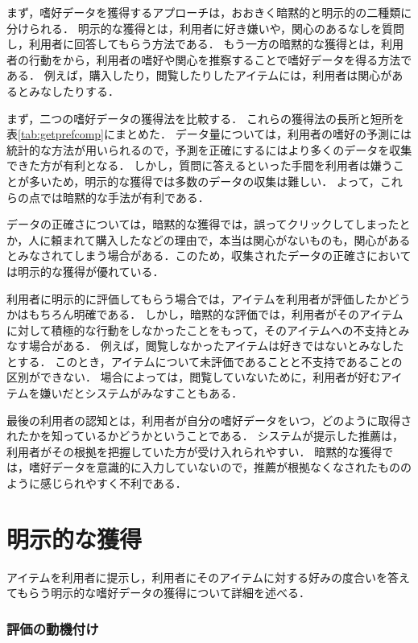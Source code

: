 まず，嗜好データを獲得するアプローチは，おおきく暗黙的と明示的の二種類に分けられる．
明示的な獲得とは，利用者に好き嫌いや，関心のあるなしを質問し，利用者に回答してもらう方法である．
もう一方の暗黙的な獲得とは，利用者の行動をから，利用者の嗜好や関心を推察することで嗜好データを得る方法である．
例えば，購入したり，閲覧したりしたアイテムには，利用者は関心があるとみなしたりする．

まず，二つの嗜好データの獲得法を比較する．
これらの獲得法の長所と短所を表\ref{tab:getprefcomp}にまとめた．
データ量については，利用者の嗜好の予測には統計的な方法が用いられるので，予測を正確にするにはより多くのデータを収集できた方が有利となる．
しかし，質問に答えるといった手間を利用者は嫌うことが多いため，明示的な獲得では多数のデータの収集は難しい．
よって，これらの点では暗黙的な手法が有利である．

データの正確さについては，暗黙的な獲得では，誤ってクリックしてしまったとか，人に頼まれて購入したなどの理由で，本当は関心がないものも，関心があるとみなされてしまう場合がある．このため，収集されたデータの正確さにおいては明示的な獲得が優れている．

利用者に明示的に評価してもらう場合では，アイテムを利用者が評価したかどうかはもちろん明確である．
しかし，暗黙的な評価では，利用者がそのアイテムに対して積極的な行動をしなかったことをもって，そのアイテムへの不支持とみなす場合がある．
例えば，閲覧しなかったアイテムは好きではないとみなしたとする．
このとき，アイテムについて未評価であることと不支持であることの区別ができない．
場合によっては，閲覧していないために，利用者が好むアイテムを嫌いだとシステムがみなすこともある．

最後の利用者の認知とは，利用者が自分の嗜好データをいつ，どのように取得されたかを知っているかどうかということである．
システムが提示した推薦は，利用者がその根拠を把握していた方が受け入れられやすい．
暗黙的な獲得では，嗜好データを意識的に入力していないので，推薦が根拠なくなされたもののように感じられやすく不利である．

\section{明示的な獲得}
\label{sec:explicitrating}

アイテムを利用者に提示し，利用者にそのアイテムに対する好みの度合いを答えてもらう明示的な嗜好データの獲得について詳細を述べる．

\subsubsection{評価の動機付け}

